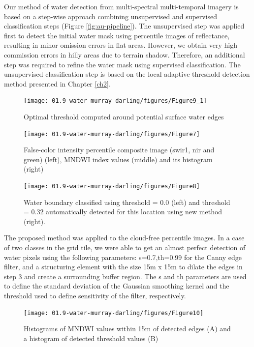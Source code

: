 Our method of water detection from multi-spectral multi-temporal imagery is based on a step-wise approach combining unsupervised and supervised classification steps (Figure \ref{fig:au-pipeline}). The unsupervised step was applied first to detect the initial water mask using percentile images of reflectance, resulting in minor omission errors in flat areas. However, we obtain very high commission errors in hilly areas due to terrain shadow. Therefore, an additional step was required to refine the water mask using supervised classification. The unsupervised classification step is based on the local adaptive threshold detection method presented in Chapter \ref{ch2}. 

\begin{figure}[H]
	\centering
	\texttt{[image: 01.9-water-murray-darling/figures/Figure9\_1]}
	\caption{Optimal threshold computed around potential surface water edges}
\end{figure}

\begin{figure}[H]
	\centering
	\texttt{[image: 01.9-water-murray-darling/figures/Figure7]}
	\caption{False-color intensity percentile composite image (swir1, nir and green) (left), MNDWI index values (middle) and its histogram (right)}
\end{figure}

\begin{figure}[H]
	\centering
	\texttt{[image: 01.9-water-murray-darling/figures/Figure8]}
	\caption{Water boundary classified using threshold = 0.0 (left) and threshold = 0.32 automatically detected for this location using new method (right).}
	\label{fig:au_river_water_hist}
\end{figure}

The proposed method was applied to the cloud-free percentile images. In a case of two classes in the grid tile, we were able to get an almost perfect detection of water pixels using the following parameters: s=0.7,th=0.99 for the Canny edge filter, and a structuring element with the size 15m x 15m to dilate the edges in step 3 and create a surrounding buffer region. The s and th parameters are used to define the standard deviation of the Gaussian smoothing kernel and the threshold used to define sensitivity of the filter, respectively.

\begin{figure}
	\centering
	\texttt{[image: 01.9-water-murray-darling/figures/Figure10]}
	\caption{Histograms of MNDWI values within 15m of detected edges (A) and a histogram of detected threshold values (B)}
	\label{fig:au-ndwi-values}
\end{figure}

